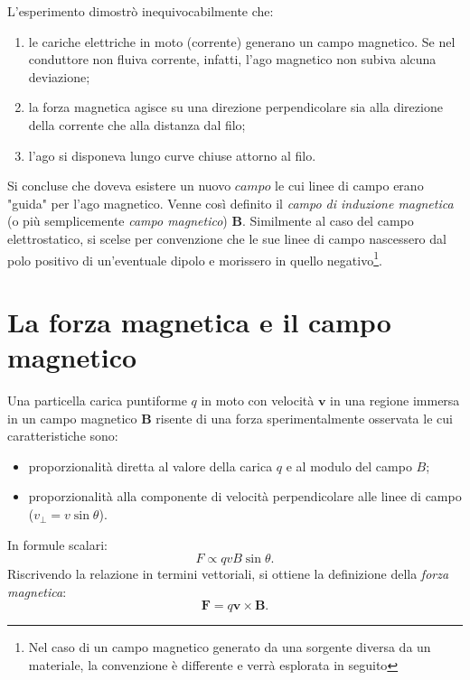 \documentclass[a4paper,11pt]{report}
\begin{document}
L'esperimento dimostrò inequivocabilmente che:
\begin{enumerate}
    \item le cariche elettriche in moto (corrente) generano un campo magnetico. Se nel conduttore non fluiva corrente, infatti, l'ago magnetico non subiva alcuna deviazione;
    \item la forza magnetica agisce su una direzione perpendicolare sia alla direzione della corrente che alla distanza dal filo;
    \item l'ago si disponeva lungo curve chiuse attorno al filo.
\end{enumerate}
Si concluse che doveva esistere un nuovo $campo$ le cui linee di campo erano "guida" per l'ago magnetico. Venne così definito il \textit{campo di induzione magnetica} (o più semplicemente \textit{campo magnetico}) $\bm{B}$. Similmente al caso del campo elettrostatico, si scelse per convenzione che le sue linee di campo nascessero dal polo positivo di un'eventuale dipolo e morissero in quello negativo\footnote{Nel caso di un campo magnetico generato da una sorgente diversa da un materiale, la convenzione è differente e verrà esplorata in seguito}. 

\section{La forza magnetica e il campo magnetico}

Una particella carica puntiforme $q$ in moto con velocità $\bm{v}$ in una regione immersa in un campo magnetico $\bm{B}$ risente di una forza sperimentalmente osservata le cui caratteristiche sono:
\begin{itemize}
    \item proporzionalità diretta al valore della carica $q$ e al modulo del campo $B$;
    \item proporzionalità alla componente di velocità perpendicolare alle linee di campo ($v_{\perp} = v \sin\theta$).
\end{itemize}
In formule scalari:
\begin{equation}
    F \propto q v B \sin\theta.
\end{equation}
Riscrivendo la relazione in termini vettoriali, si ottiene la definizione della \textit{forza magnetica}:
\begin{equation}
    \bm{F} = q \bm{v} \times \bm{B}.
    \label{eq:forza_lorentz}
\end{equation}
\end{document}
